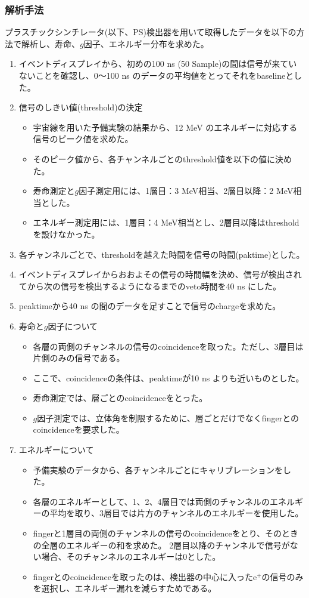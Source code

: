\subsubsection{解析手法}
プラスチックシンチレータ(以下、PS)検出器を用いて取得したデータを以下の方法で解析し、寿命、$g$因子、エネルギー分布を求めた。
\begin{enumerate}
\item イベントディスプレイから、初めの100 ns (50 Sample)の間は信号が来ていないことを確認し、0〜100 ns のデータの平均値をとってそれをbaselineとした。
\item 信号のしきい値(threshold)の決定
\begin{itemize}
\item 宇宙線を用いた予備実験の結果から、12 MeV のエネルギーに対応する信号のピーク値を求めた。
\item そのピーク値から、各チャンネルごとのthreshold値を以下の値に決めた。
\item 寿命測定と$g$因子測定用には、1層目：3 MeV相当、2層目以降：2 MeV相当とした。
\item エネルギー測定用には、1層目：4 MeV相当とし、2層目以降はthresholdを設けなかった。
\end{itemize}
\item 各チャンネルごとで、thresholdを越えた時間を信号の時間(paktime)とした。
\item イベントディスプレイからおおよその信号の時間幅を決め、信号が検出されてから次の信号を検出するようになるまでのveto時間を40 ns にした。
\item peaktimeから40 ns の間のデータを足すことで信号のchargeを求めた。
\item 寿命と$g$因子について
\begin{itemize}
\item 各層の両側のチャンネルの信号のcoincidenceを取った。ただし、3層目は片側のみの信号である。
\item ここで、coincidenceの条件は、peaktimeが10 ns よりも近いものとした。
\item 寿命測定では、層ごとのcoincidenceをとった。
\item $g$因子測定では、立体角を制限するために、層ごとだけでなくfingerとのcoincidenceを要求した。
\end{itemize}
\item エネルギーについて
\begin{itemize}
\item 予備実験のデータから、各チャンネルごとにキャリブレーションをした。
\item 各層のエネルギーとして、1、2、4層目では両側のチャンネルのエネルギーの平均を取り、3層目では片方のチャンネルのエネルギーを使用した。
\item fingerと1層目の両側のチャンネルの信号のcoincidenceをとり、そのときの全層のエネルギーの和を求めた。
2層目以降のチャンネルで信号がない場合、そのチャンネルのエネルギーは0とした。
\item fingerとのcoincidenceを取ったのは、検出器の中心に入ったe$^{+}$の信号のみを選択し、エネルギー漏れを減らすためである。
\end{itemize}
\end{enumerate}

